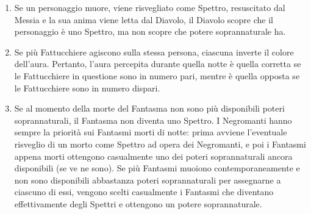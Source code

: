 \documentclass[a4paper,10pt]{article}
\begin{document}
\begin{enumerate}
 \item Se un personaggio muore, viene risvegliato come Spettro, resuscitato dal Messia e la sua anima viene letta dal Diavolo, il Diavolo scopre che il personaggio è uno Spettro, ma non scopre che potere soprannaturale ha.
 
 \item Se più Fattucchiere agiscono sulla stessa persona, ciascuna inverte il colore dell'aura. Pertanto, l'aura percepita durante quella notte è quella corretta se le Fattucchiere in questione sono in numero pari, mentre è quella opposta se le Fattucchiere sono in numero dispari.
 
 \item Se al momento della morte del Fantasma non sono più disponibili poteri soprannaturali, il Fantasma non diventa uno Spettro.
 I Negromanti hanno sempre la priorità sui Fantasmi morti di notte: prima avviene l'eventuale risveglio di un morto come Spettro ad opera dei Negromanti, e poi i Fantasmi appena morti ottengono casualmente uno dei poteri soprannaturali ancora disponibili (se ve ne sono).
 Se più Fantasmi muoiono contemporaneamente e non sono disponibili abbastanza poteri soprannaturali per assegnarne a ciascuno di essi, vengono scelti casualmente i Fantasmi che diventano effettivamente degli Spettri e ottengono un potere soprannaturale.
\end{enumerate}

\printindex
\end{document}
